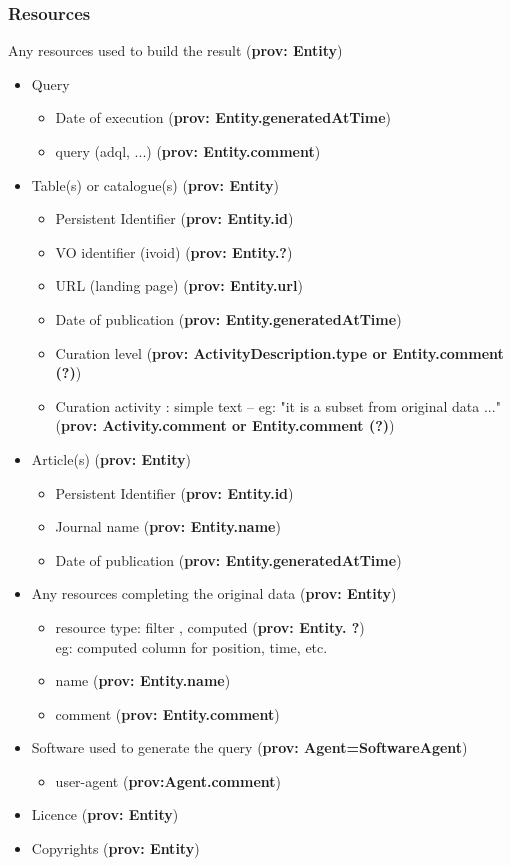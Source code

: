 \documentclass[11pt,a4paper]{ivoa}
\begin{document}
\subsubsection{Resources}
Any resources used to build the result (\textbf{prov: Entity})
\begin{itemize}
	\item Query
	\begin{itemize}
		\item Date of execution (\textbf{prov: Entity.generatedAtTime})
		\item query (adql, ...) (\textbf{prov: Entity.comment})
	\end{itemize}
	\item Table(s) or catalogue(s) (\textbf{prov: Entity})
	\begin{itemize}
		\item Persistent Identifier (\textbf{prov: Entity.id})
		\item VO identifier (ivoid) (\textbf{prov: Entity.?})
		\item URL (landing page) (\textbf{prov: Entity.url})
		\item Date of publication (\textbf{prov: Entity.generatedAtTime})
		\item Curation level (\textbf{prov: ActivityDescription.type or Entity.comment (?)})
		\item Curation activity : simple text – eg: "it is a subset from original data ..." (\textbf{prov: Activity.comment or Entity.comment (?)})
	\end{itemize}
	\item Article(s) (\textbf{prov: Entity})
	\begin{itemize}
		\item Persistent Identifier (\textbf{prov: Entity.id})
		\item Journal name (\textbf{prov: Entity.name})
		\item Date of publication (\textbf{prov: Entity.generatedAtTime})
	\end{itemize}
	\item Any resources completing the original data (\textbf{prov: Entity})
	\begin{itemize}
		\item resource type: filter , computed (\textbf{prov: Entity. ?})\\
		eg: computed column for position, time, etc.
		\item name (\textbf{prov: Entity.name})
		\item comment (\textbf{prov: Entity.comment})
	\end{itemize}
	\item Software used to generate the query (\textbf{prov: Agent=SoftwareAgent})
	\begin{itemize}
		\item user-agent (\textbf{prov:Agent.comment})
	\end{itemize}
	\item Licence (\textbf{prov: Entity})
	\item Copyrights (\textbf{prov: Entity})
\end{itemize}
\end{document}
